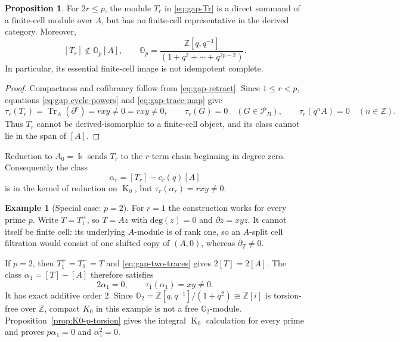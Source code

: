 \documentclass[11pt]{article}
\theoremstyle{definition}
\newtheorem{prop}[thm]{Proposition}
\newtheorem{example}[thm]{Example}
\numberwithin{equation}{section}
\newcommand{\kk}{\Bbbk}
\newcommand{\Pun}{\mathcal{P}_B}
\newcommand{\K}{\operatorname{K}_0}
\begin{document}
\begin{prop}\label{prop:gap-counterexamples}
For $2r\le p$, the module $T_r$ in \eqref{eq:gap-Tr} is a direct summand of
a finite-cell module over $A$, but has no
finite-cell representative in the derived category.  Moreover,
\begin{equation}\label{eq:gap-not-generated}
 [T_r]\notin\mathbb O_p[A],\qquad
 \mathbb O_p=\frac{\mathbb Z[q,q^{-1}]}{(1+q^2+\cdots+q^{2p-2})}.
\end{equation}
In particular, its essential finite-cell image is not idempotent complete.
\end{prop}

\begin{proof}
Compactness and cofibrancy follow from \eqref{eq:gap-retract}.
Since $1\le r<p$, equations \eqref{eq:gap-cycle-powers} and
\eqref{eq:gap-trace-map} give
\[
 \tau_r(T_r)= \operatorname{Tr}_{A}(\partial^{r})=rxy\ne0=rxy\ne0,\qquad
 \tau_r(G)=0\quad(G\in\Pun),\qquad
 \tau_r(q^nA)=0\quad(n\in\mathbb Z).
\]
Thus $T_r$ cannot be derived-isomorphic to a finite-cell object, and its
class cannot lie in the span of $[A]$. 
\end{proof}

Reduction to $A_0=\kk$ sends $T_r$ to the $r$-term chain beginning
in degree zero.  Consequently the class
\begin{equation}\label{eq:gap-extra-class}
 \alpha_r=[T_r]-c_r(q)[A]
\end{equation}
is in the kernel of reduction on $\K$, but
$\tau_r(\alpha_r)=rxy\ne0$. 

\begin{example}[Special case: $p=2$]
\label{ex:gap-rankone}
For $r=1$ the construction works for every prime $p$.  Write $T=T_1^+$,
so $T=Az$ with $\mathrm{deg}(z)=0$ and $\partial z=xyz$.
It cannot itself be finite cell: its underlying $A$-module is of rank one, so an
$A$-split cell filtration would consist of one shifted copy of $(A,0)$,
whereas $\partial_T\ne0$.


If $p=2$, then $T_1^+=T_1^-=T$ and
\eqref{eq:gap-two-traces} gives $2[T]=2[A]$.  The class
$\alpha_1=[T]-[A]$ therefore satisfies
\[
 2\alpha_1=0,\qquad \tau_1(\alpha_1)=xy\ne0.
\]
It has exact additive order $2$.  Since
$\mathbb O_2=\mathbb Z[q,q^{-1}]/(1+q^2)\cong \mathbb{Z}[i]$ is torsion-free over
$\mathbb Z$, compact $K_0$ in this example is not a free
$\mathbb O_2$-module.  Proposition~\ref{prop:K0-p-torsion} gives the
integral $\K$ calculation for every prime and proves
$p\alpha_1=0$ and $\alpha_1^2=0$.
\end{example}
\end{document}
